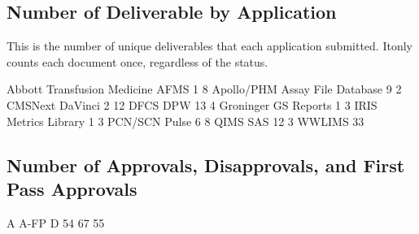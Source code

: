 \documentclass{article}
\begin{document}
\subsection{Number of Deliverable by Application}
This is the number of unique deliverables that each application submitted. Itonly counts
each document once, regardless of the status.
\begin{Schunk}
\begin{Soutput}
Abbott Transfusion Medicine                        AFMS 
                          1                           8 
                 Apollo/PHM         Assay File Database 
                          9                           2 
                    CMSNext                     DaVinci 
                          2                          12 
                       DFCS                         DPW 
                         13                           4 
                  Groninger                  GS Reports 
                          1                           3 
                       IRIS             Metrics Library 
                          1                           3 
                    PCN/SCN                       Pulse 
                          6                           8 
                       QIMS                         SAS 
                         12                           3 
                     WWLIMS 
                         33 
\end{Soutput}
\end{Schunk}

\subsection{Number of Approvals, Disapprovals, and First Pass Approvals}

\begin{Schunk}
\begin{Soutput}
   A A-FP    D 
  54   67   55 
\end{Soutput}
\end{Schunk}
\end{document}
